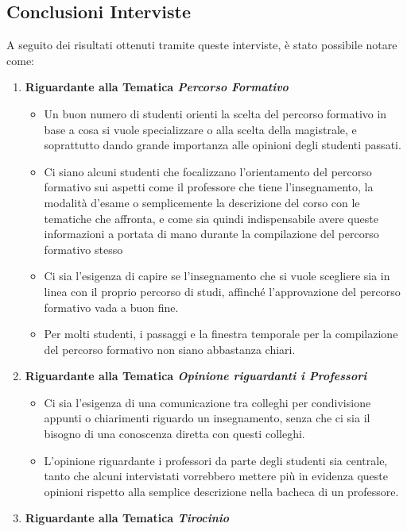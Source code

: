 \subsection{Conclusioni Interviste}
A seguito dei risultati ottenuti tramite queste interviste, è stato possibile notare come:
\begin{enumerate}
    \item \textbf{Riguardante alla Tematica \textit{Percorso Formativo}}
    \begin{itemize}
        \item Un buon numero di studenti orienti la scelta del percorso formativo in base 
        a cosa si vuole specializzare o alla scelta della magistrale, e soprattutto dando grande importanza alle opinioni degli studenti passati.
        \item Ci siano alcuni studenti che focalizzano l'orientamento del percorso formativo sui aspetti come il professore che tiene l'insegnamento, la modalità d'esame o semplicemente la descrizione del corso con le tematiche che affronta,
        e come sia quindi indispensabile avere queste informazioni a portata di mano durante la compilazione del percorso formativo stesso
        \item Ci sia l'esigenza di capire se l'insegnamento che si vuole scegliere sia in linea con il proprio percorso di studi, affinché l'approvazione del percorso formativo vada a buon fine.
        \item Per molti studenti, i passaggi e la finestra temporale per la compilazione del percorso formativo non siano abbastanza chiari.
    \end{itemize}
    \item \textbf{Riguardante alla Tematica \textit{Opinione riguardanti i Professori}}
    \begin{itemize}
        \item Ci sia l'esigenza di una comunicazione tra colleghi per condivisione appunti o chiarimenti riguardo un insegnamento, senza che ci sia il bisogno di una conoscenza diretta con questi colleghi.
        \item L'opinione riguardante i professori da parte degli studenti sia centrale, tanto che alcuni intervistati vorrebbero mettere più
        in evidenza queste opinioni rispetto alla semplice descrizione nella bacheca di un professore.
    \end{itemize}
    \item \textbf{Riguardante alla Tematica \textit{Tirocinio}}
    \begin{itemize}

\end{itemize}
\end{enumerate}
